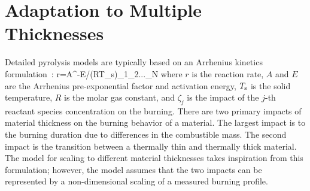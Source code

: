 \section{Adaptation to Multiple Thicknesses}

Detailed pyrolysis models are typically based on an Arrhenius kinetics formulation~\cite{Stoliarov:IAFSS2023}:
\be
r=A^{-E/(RT_{{\rm s}})}\zeta_1\zeta_2...\zeta_{{\rm N}}
\ee
where $r$ is the reaction rate, $A$ and $E$ are the Arrhenius pre-exponential factor and activation energy, $T_{{\rm s}}$ is the solid temperature, $R$ is the molar gas constant, and $\zeta_{j}$ is the impact of the $j$-th reactant species concentration on the burning. There are two primary impacts of material thickness on the burning behavior of a material. The largest impact is to the burning duration due to differences in the combustible mass. The second impact is the transition between a thermally thin and thermally thick material. The model for scaling to different material thicknesses takes inspiration from this formulation; however, the model assumes that the two impacts can be represented by a non-dimensional scaling of a measured burning profile.

